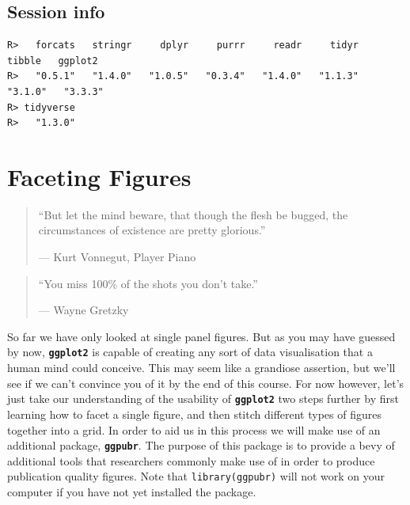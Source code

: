 \documentclass[
]{book}
\newenvironment{Shaded}{\begin{snugshade}}{\end{snugshade}}
\newcommand{\FunctionTok}[1]{\textcolor[rgb]{0.00,0.00,0.00}{#1}}
\newcommand{\NormalTok}[1]{#1}
\newcommand{\SpecialCharTok}[1]{\textcolor[rgb]{0.00,0.00,0.00}{#1}}
\newcommand{\StringTok}[1]{\textcolor[rgb]{0.31,0.60,0.02}{#1}}
\begin{document}
\hypertarget{session-info-3}{%
\section{Session info}\label{session-info-3}}

\begin{Shaded}
\end{Shaded}

\begin{verbatim}
R>   forcats   stringr     dplyr     purrr     readr     tidyr    tibble   ggplot2 
R>   "0.5.1"   "1.4.0"   "1.0.5"   "0.3.4"   "1.4.0"   "1.1.3"   "3.1.0"   "3.3.3" 
R> tidyverse 
R>   "1.3.0"
\end{verbatim}

\hypertarget{faceting}{%
\chapter{Faceting Figures}\label{faceting}}

\begin{quote}
``But let the mind beware, that though the flesh be bugged, the circumstances of existence are pretty glorious.''

--- Kurt Vonnegut, Player Piano
\end{quote}

\begin{quote}
``You miss 100\% of the shots you don't take.''

--- Wayne Gretzky
\end{quote}

So far we have only looked at single panel figures. But as you may have guessed by now, \textbf{\texttt{ggplot2}} is capable of creating any sort of data visualisation that a human mind could conceive. This may seem like a grandiose assertion, but we'll see if we can't convince you of it by the end of this course. For now however, let's just take our understanding of the usability of \textbf{\texttt{ggplot2}} two steps further by first learning how to facet a single figure, and then stitch different types of figures together into a grid. In order to aid us in this process we will make use of an additional package, \textbf{\texttt{ggpubr}}. The purpose of this package is to provide a bevy of additional tools that researchers commonly make use of in order to produce publication quality figures. Note that \texttt{library(ggpubr)} will not work on your computer if you have not yet installed the package.
\end{document}
